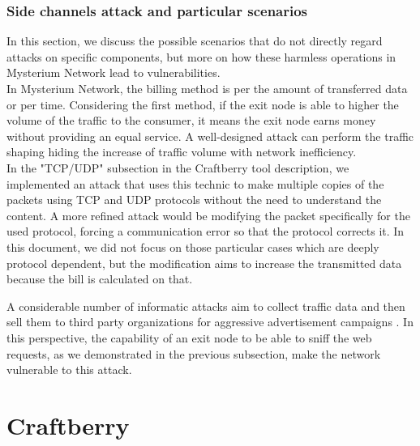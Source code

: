 \documentclass[12pt]{article}
\begin{document}
	\subsubsection{Side channels attack and particular scenarios}
	In this section, we discuss the possible scenarios that do not directly regard attacks on specific components, but more on how these harmless operations in Mysterium Network lead to vulnerabilities.\\
	In Mysterium Network, the billing method is per the amount of transferred data or per time. Considering the first method, if the exit node is able to higher the volume of the traffic to the consumer, it means the exit node earns money without providing an equal service. A well-designed attack can perform the traffic shaping hiding the increase of traffic volume with network inefficiency.\\
	In the "TCP/UDP" subsection in the Craftberry tool description, we implemented an attack that uses this technic to make multiple copies of the packets using TCP and UDP protocols without the need to understand the content. A more refined attack would be modifying the packet specifically for the used protocol, forcing a communication error so that the protocol corrects it. In this document, we did not focus on those particular cases which are deeply protocol dependent, but the modification aims to increase the transmitted data because the bill is calculated on that.\\
	\bigbreak

	A considerable number of informatic attacks aim to collect traffic data and then sell them to third party organizations for aggressive advertisement campaigns \cite{VPNsellData}. In this perspective, the capability of an exit node to be able to sniff the web requests, as we demonstrated in the previous subsection, make the network vulnerable to this attack.\\

	\newpage
	\section{Craftberry}
\end{document}
